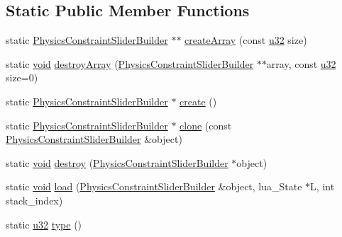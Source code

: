 \subsection*{Static Public Member Functions}
\begin{DoxyCompactItemize}
\item 
static \mbox{\hyperlink{classnjli_1_1_physics_constraint_slider_builder}{Physics\+Constraint\+Slider\+Builder}} $\ast$$\ast$ \mbox{\hyperlink{classnjli_1_1_physics_constraint_slider_builder_a0eea07fc0548741da6cdee5d9e293b42}{create\+Array}} (const \mbox{\hyperlink{_util_8h_a10e94b422ef0c20dcdec20d31a1f5049}{u32}} size)
\item 
static \mbox{\hyperlink{_thread_8h_af1e856da2e658414cb2456cb6f7ebc66}{void}} \mbox{\hyperlink{classnjli_1_1_physics_constraint_slider_builder_a2ecf524907abc5887dcc314a99297da8}{destroy\+Array}} (\mbox{\hyperlink{classnjli_1_1_physics_constraint_slider_builder}{Physics\+Constraint\+Slider\+Builder}} $\ast$$\ast$array, const \mbox{\hyperlink{_util_8h_a10e94b422ef0c20dcdec20d31a1f5049}{u32}} size=0)
\item 
static \mbox{\hyperlink{classnjli_1_1_physics_constraint_slider_builder}{Physics\+Constraint\+Slider\+Builder}} $\ast$ \mbox{\hyperlink{classnjli_1_1_physics_constraint_slider_builder_ad5e304bea0271dd4a80c904a96e569cc}{create}} ()
\item 
static \mbox{\hyperlink{classnjli_1_1_physics_constraint_slider_builder}{Physics\+Constraint\+Slider\+Builder}} $\ast$ \mbox{\hyperlink{classnjli_1_1_physics_constraint_slider_builder_ae1deeaba866dddbb8a71ec1b28571ea4}{clone}} (const \mbox{\hyperlink{classnjli_1_1_physics_constraint_slider_builder}{Physics\+Constraint\+Slider\+Builder}} \&object)
\item 
static \mbox{\hyperlink{_thread_8h_af1e856da2e658414cb2456cb6f7ebc66}{void}} \mbox{\hyperlink{classnjli_1_1_physics_constraint_slider_builder_af5f8d51f95ad9d7e0c503e748f76be63}{destroy}} (\mbox{\hyperlink{classnjli_1_1_physics_constraint_slider_builder}{Physics\+Constraint\+Slider\+Builder}} $\ast$object)
\item 
static \mbox{\hyperlink{_thread_8h_af1e856da2e658414cb2456cb6f7ebc66}{void}} \mbox{\hyperlink{classnjli_1_1_physics_constraint_slider_builder_af4327a38490149a4265c9f7101b635d7}{load}} (\mbox{\hyperlink{classnjli_1_1_physics_constraint_slider_builder}{Physics\+Constraint\+Slider\+Builder}} \&object, lua\+\_\+\+State $\ast$L, int stack\+\_\+index)
\item 
static \mbox{\hyperlink{_util_8h_a10e94b422ef0c20dcdec20d31a1f5049}{u32}} \mbox{\hyperlink{classnjli_1_1_physics_constraint_slider_builder_aede51b8778aef72bf1134f8693a773b0}{type}} ()
\end{DoxyCompactItemize}
